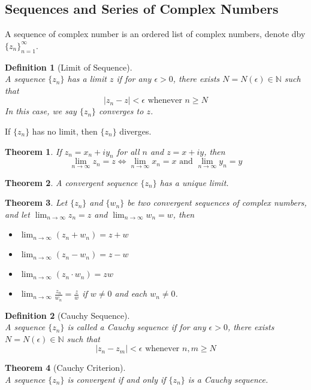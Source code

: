 \documentclass[12pt]{article}
\newtheorem{definition}{Definition}[section]
\newtheorem{theorem}{Theorem}[section]
\theoremstyle{definition}
\begin{document}
\subsection{Sequences and Series of Complex Numbers}
A sequence of complex number is an ordered list of complex numbers, denote dby $\{z_n\}_{n=1}^\infty$.
\begin{definition}[Limit of Sequence]
\hfill\\\normalfont A sequence $\{z_n\}$ has a limit $z$ if for any $\epsilon>0$, there exists $N=N(\epsilon)\in \mathbb{N}$ such that
\[
|z_n-z|< \epsilon \text{ whenever }n\geq N
\]
In this case, we say $\{z_n\}$ converges to $z$.
\end{definition}
If $\{z_n\}$ has no limit, then $\{z_n\}$ diverges.
\begin{theorem}\normalfont If $z_n = x_n + iy_n$ for all $n$ and $z=x+iy$, then
\[
\lim_{n\to\infty}z_n = z \Leftrightarrow \lim_{n\to\infty} x_n = x \text{ and }\lim_{n\to\infty} y_n = y
\]
\end{theorem}
\begin{theorem}\normalfont A convergent sequence $\{z_n\}$ has a unique limit.
\end{theorem}
\begin{theorem}\normalfont Let $\{z_n\}$ and $\{w_n\}$ be two convergent sequences of complex numbers, and let $\lim_{n\to\infty} z_n = z$ and $\lim_{n\to\infty} w_n = w$, then 
\begin{itemize}
	\item $\lim_{n\to\infty}(z_n + w_n) = z+w$
	\item $\lim_{n\to\infty}(z_n - w_n) = z-w$
	\item $\lim_{n\to\infty}(z_n\cdot w_n) = zw$
	\item $\lim_{n\to\infty}\frac{z_n}{w_n}=\frac{z}{w}$ if $w\neq 0$ and each $w_n\neq 0$.
\end{itemize}
\end{theorem}
\begin{definition}[Cauchy Sequence]
\hfill\\\normalfont A sequence $\{z_n\}$ is called a Cauchy sequence if for any $\epsilon>0$, there exists $N=N(\epsilon)\in \mathbb{N}$ such that
\[
|z_n - z_m|<\epsilon\text{ whenever }n, m \geq N
\]
\end{definition}
\begin{theorem}[Cauchy Criterion]
\hfill\\\normalfont A sequence $\{z_n\}$ is convergent if and only if $\{z_n\}$ is a Cauchy sequence.
\end{theorem}
\end{document}
